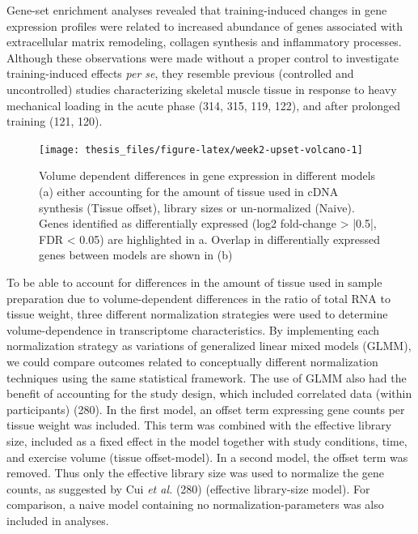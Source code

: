 \documentclass[twoside,10pt]{gihclass} %
\begin{document}
Gene-set enrichment analyses revealed that training-induced changes in gene expression profiles were related to increased abundance of genes associated with extracellular matrix remodeling, collagen synthesis and inflammatory processes. Although these observations were made without a proper control to investigate training-induced effects \emph{per se}, they resemble previous (controlled and uncontrolled) studies characterizing skeletal muscle tissue in response to heavy mechanical loading in the acute phase
(314, 315, 119, 122),
and after prolonged training (121, 120).
\begin{figure}

{\centering \texttt{[image: thesis\_files/figure-latex/week2-upset-volcano-1]} 

}

\caption[General patterns of differentially expressed genes at Week 2]{Volume dependent differences in gene expression in different models (a) either accounting for the amount of tissue used in cDNA synthesis (Tissue offset), library sizes or un-normalized (Naive). Genes identified as differentially expressed (log2 fold-change > |0.5|, FDR < 0.05) are highlighted in a.  Overlap in differentially expressed genes between models are shown in (b)}\label{fig:week2-upset-volcano}
\end{figure}
To be able to account for differences in the amount of tissue used in sample preparation due to volume-dependent differences in the ratio of total RNA to tissue weight, three different normalization strategies were used to determine volume-dependence in transcriptome characteristics.
By implementing each normalization strategy as variations of generalized linear mixed models (GLMM), we could compare outcomes related to conceptually different normalization techniques using the same statistical framework.
The use of GLMM also had the benefit of accounting for the study design, which included correlated data (within participants)
(280).
In the first model, an offset term expressing gene counts per tissue weight was included. This term was combined with the effective library size, included as a fixed effect in the model together with study conditions, time, and exercise volume (tissue offset-model).
In a second model, the offset term was removed. Thus only the effective library size was used to normalize the gene counts, as suggested by Cui \emph{et al.}
(280) (effective library-size model).
For comparison, a naive model containing no normalization-parameters was also included in analyses.
\end{document}
